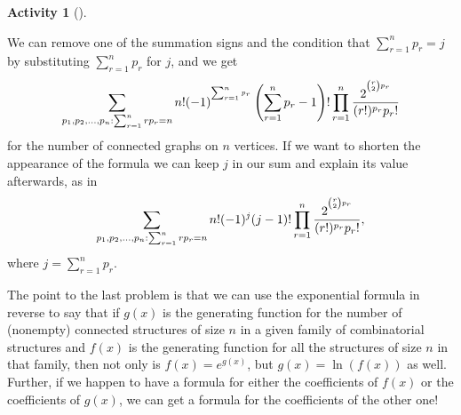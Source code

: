 \documentclass[10pt,]{book}
\theoremstyle{plain}
\theoremstyle{definition}
\newtheorem{activity}[project]{Activity}
\numberwithin{equation}{chapter}
\begin{document}
\begin{activity}[]
\begin{enumerate}[label=(\alph*)]
%
\par
We can remove one of the summation signs and the condition that \(\sum_{r=1}^n p_r=j\) by substituting \(\sum_{r=1}^n p_r\) for \(j\), and we get%
\begin{equation*}
\sum_{{p_1,p_2,\ldots,p_n: \sum_{r=1}^n
rp_r =n }}{n!}(-1)^{^{\sum_{r=1}^n p_r}}\left(\sum_{r=1}^n p_r -1\right)!
\prod_{r=1}^n{2^{^{{r\choose 2}p_r}}
\over (r!)^{p_r}p_r!}
\end{equation*}
for the number of connected graphs on \(n\) vertices. If we want to shorten the appearance of the formula we can keep \(j\) in our sum and explain its value afterwards, as in%
\begin{equation*}
\sum_{{p_1,p_2,\ldots,p_n: \sum_{r=1}^n
rp_r =n }}{n!}(-1)^j(j-1)!
\prod_{r=1}^n{2^{^{{r\choose 2}p_r}}
\over (r!)^{p_r}p_r!},
\end{equation*}
where \(j=\sum_{r=1}^n p_r\).%

\end{enumerate}
\end{activity}
The point to the last problem is that we can use the exponential formula in reverse to say that if \(g(x)\) is the generating function for the number of (nonempty) connected structures of size \(n\) in a given family of combinatorial structures and \(f(x)\) is the generating function for all the structures of size \(n\) in that family, then not only is \(f(x) =
e^{g(x)}\), but \(g(x) = \ln(f(x))\) as well. Further, if we happen to have a formula for either the coefficients of \(f(x)\) or the coefficients of \(g(x)\), we can get a formula for the coefficients of the other one!%
\typeout{************************************************}
\typeout{************************************************}
\end{document}
